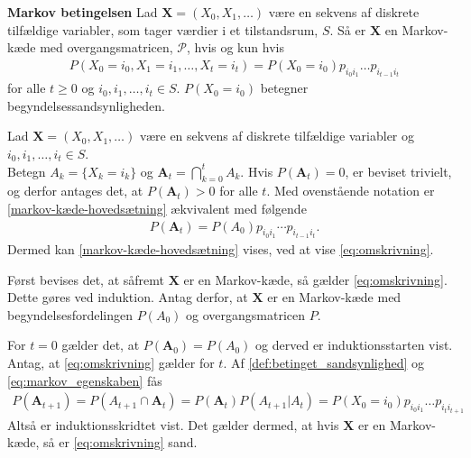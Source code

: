 \begin{minipage}\textwidth
\begin{thmx} \textbf{Markov betingelsen} \label{sæt:markov_tingtang}%
\newline 
Lad $\bm X=(X_0, X_1,\dots)$ være en sekvens af diskrete tilfældige variabler, som tager værdier i et tilstandsrum, $S$. Så er $\bm X$ en Markov-kæde med overgangsmatricen, $\mathcal{P}$, hvis og kun hvis
\begin{align}
    P(X_0=i_0,X_1=i_1,\dots, X_t=i_t)=P(X_0=i_0)p_{i_0i_1}\dots p_{i_{t-1}i_t}\label{markov-kæde-hovedsætning}
\end{align}
for alle $t\geq0$ og $i_0,i_1,\dots,i_t\in S$. $P(X_0 = i_0)$ betegner begyndelsessandsynligheden.
\end{thmx}
\end{minipage}
\begin{bev} \textbf{}
\newline
Lad $\bm X = (X_0, X_1, \dots)$ være en sekvens af diskrete tilfældige variabler og $i_0, i_1, \dots, i_t \in S$. \\
Betegn $A_k = \{X_k = i_k\}$ og $\bm A_t=\bigcap_{k=0}^t A_k$. Hvis $P(\bm A_t)=0$, er beviset trivielt, og derfor antages det, at $P(\bm A_t)>0$ for alle $t$. 
Med ovenstående notation er \eqref{markov-kæde-hovedsætning} ækvivalent med følgende
\begin{align}\label{eq:omskrivning}
    P(\bm A_t)=P(A_0)p_{i_0i_1}\cdots p_{i_{t-1}i_t}.
\end{align}
Dermed kan \eqref{markov-kæde-hovedsætning} vises, ved at vise \eqref{eq:omskrivning}.

Først bevises det, at såfremt $\bm X$ er en Markov-kæde, så gælder \eqref{eq:omskrivning}. Dette gøres ved induktion.
Antag derfor, at $\bm X$ er en Markov-kæde med begyndelsesfordelingen $P(A_0)$ og overgangsmatricen $P$. 

For $t=0$ gælder det, at $P(\bm A_0) = P(A_0)$ og derved er induktionsstarten vist. Antag, at \eqref{eq:omskrivning} gælder for $t$. Af \autoref{def:betinget_sandsynlighed} og \eqref{eq:markov_egenskaben} fås
%
\begin{align*}
     P(\bm A_{t+1}) = P(A_{t+1}\cap \bm A_{t})= P(\bm A_{t})P(A_{t+1}| A_t)=P(X_0=i_0)p_{i_0i_1}\dots p_{i_{t}i_{t+1}}
\end{align*}
Altså er induktionsskridtet vist. Det gælder dermed, at hvis $\bm X$ er en Markov-kæde, så er \eqref{eq:omskrivning} sand.  


\end{bev}
